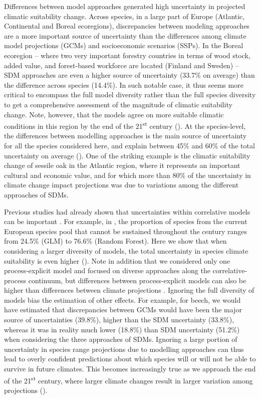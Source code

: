 Differences between model approaches generated high uncertainty in projected climatic suitability change. 
Across species, in a large part of Europe (Atlantic, Continental and Boreal ecoregions), discrepancies between modeling approaches are a more important source of uncertainty than the differences among climate model projections (GCMs) and socioeconomic scenarios (SSPs). In the Boreal ecoregion -- where two very important forestry countries in terms of wood stock, added value, and forest-based workforce are located (Finland and Sweden) -- SDM approaches are even a higher source of uncertainty (33.7\% on average) than the difference across species (14.4\%). In such notable case, it thus seems more critical to encompass the full model diversity rather than the full species diversity to get a comprehensive assessment of the magnitude of climatic suitability change. Note, however, that the models agree on more suitable climatic conditions in this region by the end of the 21\textsuperscript{st} century (). At the species-level, the differences between modelling approaches is the main source of uncertainty for all the species considered here, and explain between 45\% and 60\% of the total uncertainty on average (). 
One of the striking example is the climatic suitability change of sessile oak in the Atlantic region, where it represents an important cultural and economic value, and for which more than 80\% of the uncertainty in climate change impact projections was due to variations among the different approaches of SDMs.

Previous studies had already shown that uncertainties within correlative models can be important  \citep{Thuiller2019}. For example, in \citet{Wessely2024}, the proportion of species from the current European species pool that cannot be sustained throughout the century ranges from 24.5\% (GLM) to 76.6\% (Random Forest). Here we show that when considering a larger diversity of models, the total uncertainty in species climate suitability is even higher (). Note in addition that we considered only one process-explicit model and focused on diverse approaches along the correlative-process continuum, but differences between process-explicit models can also be higher than differences between climate projections \citep{Asseng2013}. Ignoring the full diversity of models bias the estimation of other effects. For example, for beech, we would have estimated that discrepancies between GCMs would have been the major source of uncertainties (39.8\%), higher than the SDM uncertainty (33.8\%), whereas it was in reality much lower (18.8\%) than SDM uncertainty (51.2\%) when considering the three approaches of SDMs. Ignoring a large portion of uncertainty in species range projections due to modelling approaches can thus lead to overly confident predictions about which species will or will not be able to survive in future climates.  This becomes increasingly true as we approach the end of the 21\textsuperscript{st} century, where larger climate changes result in larger variation among projections ().

